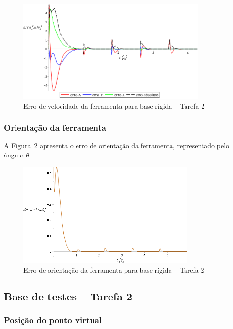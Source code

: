 \begin{figure}[h]
	\centering 
 	\includegraphics[width=0.85\textwidth]{figs/t2_errovelf_base_rig}
 	\caption{Erro de velocidade da ferramenta para base rígida -- Tarefa 2}
 	\label{fig::t2_errovelf_base_rig}
\end{figure}


\subsubsection{Orientação da ferramenta}

A Figura~\ref{fig::t2_erroori_base_rig} apresenta o erro de orientação da
ferramenta, representado pelo ângulo $\theta$.

\begin{figure}[h]
	\centering 
 	\includegraphics[width=0.80\textwidth]{figs/t2_erroori_base_rig}
 	\caption{Erro de orientação da ferramenta para base rígida -- Tarefa
 	2}
 	\label{fig::t2_erroori_base_rig}
\end{figure}


\subsection{Base de testes -- Tarefa 2}

\subsubsection{Posição do ponto virtual}

